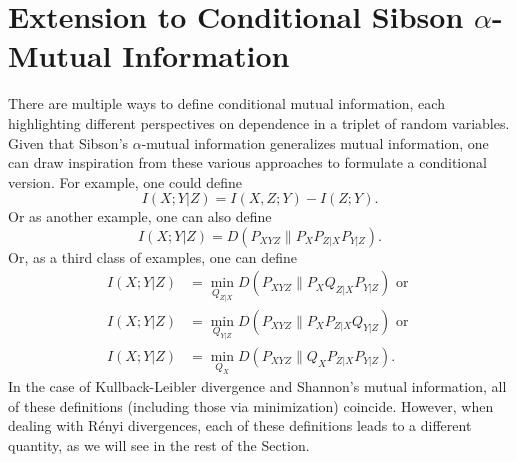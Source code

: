 \documentclass{article}
\numberwithin{theorem}{section}
\numberwithin{example}{section}
\numberwithin{remark}{section}
\numberwithin{definition}{section}
\newcommand{\revised}[1]{{\color{black} #1}}
\begin{document}
\section{Extension to Conditional Sibson $\alpha$-Mutual Information}\label{sec:conditional}
\revised{There are multiple ways to define conditional mutual information, each highlighting different perspectives on dependence in a triplet of random variables.  Given that Sibson’s $\alpha$-mutual information generalizes mutual information, one can draw inspiration from these various approaches to formulate a conditional version. 
For example, one could define \begin{equation*}
    I(X;Y|Z)=I(X,Z;Y)-I(Z;Y).
\end{equation*}
Or as another example, one can also define 
\begin{equation*}
    I(X;Y|Z) = D(P_{XYZ}\|P_XP_{Z|X}P_{Y|Z}).
\end{equation*}
Or, as a third class of examples, one can define
\begin{align*}
    I(X;Y|Z) &= \min_{Q_{Z|X}} D(P_{XYZ}\|P_XQ_{Z|X}P_{Y|Z}) \text{ or }\\
    I(X;Y|Z) &= \min_{Q_{Y|Z}} D(P_{XYZ}\|P_XP_{Z|X}Q_{Y|Z}) \text{ or } \\
    I(X;Y|Z) &= \min_{Q_X} D(P_{XYZ}\|Q_XP_{Z|X}P_{Y|Z}).
\end{align*}
In the case of Kullback-Leibler divergence and Shannon's mutual information, all of these definitions (including those via minimization) coincide.
However, when dealing with R\'enyi divergences, each of these definitions leads to a different quantity, as we will see in the rest of the Section.}

\end{document}
